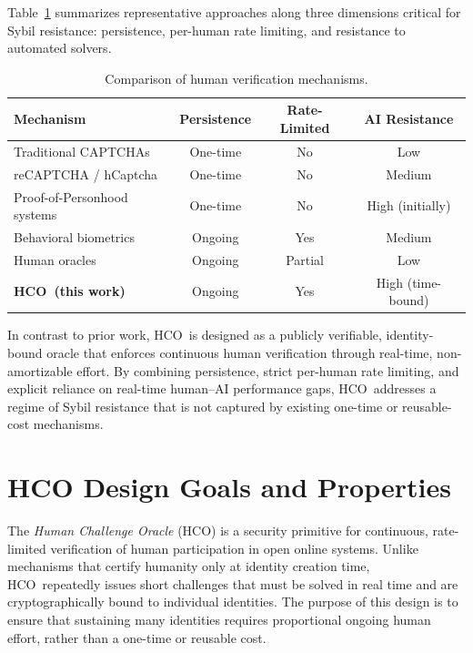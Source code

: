 \documentclass[11pt]{article}
\newcommand{\HCO}{HCO\xspace}
\begin{document}
\medskip
Table~\ref{tab:hco-taxonomy} summarizes representative approaches along three dimensions critical for Sybil resistance: persistence, per-human rate limiting, and resistance to automated solvers.

\begin{table}[t]
	\centering
	\caption{Comparison of human verification mechanisms.}
	\label{tab:hco-taxonomy}
	\begin{tabular}{lccc}
		\toprule
		Mechanism & Persistence & Rate-Limited & AI Resistance \\
		\midrule
		Traditional CAPTCHAs \cite{vonahn2003captcha} & One-time & No & Low \\
		reCAPTCHA / hCaptcha \cite{reCAPTCHA2019,hCaptcha2020} & One-time & No & Medium \\
		Proof-of-Personhood systems \cite{worldcoin2023,brightid2022} & One-time & No & High (initially) \\
		Behavioral biometrics \cite{biometrics2021} & Ongoing & Yes & Medium \\
		Human oracles \cite{ellis2017chainlink} & Ongoing & Partial & Low \\
		\textbf{\HCO\ (this work)} & Ongoing & Yes & High (time-bound) \\
		\bottomrule
	\end{tabular}
\end{table}

In contrast to prior work, \HCO\ is designed as a publicly verifiable, identity-bound oracle that enforces continuous human verification through real-time, non-amortizable effort. By combining persistence, strict per-human rate limiting, and explicit reliance on real-time human--AI performance gaps, \HCO\ addresses a regime of Sybil resistance that is not captured by existing one-time or reusable-cost mechanisms.

	
\section{HCO Design Goals and Properties}

The \emph{Human Challenge Oracle} (\HCO) is a security primitive for continuous, rate-limited verification of human participation in open online systems. Unlike mechanisms that certify humanity only at identity creation time, \HCO\ repeatedly issues short challenges that must be solved in real time and are cryptographically bound to individual identities. The purpose of this design is to ensure that sustaining many identities requires proportional ongoing human effort, rather than a one-time or reusable cost.
\end{document}
